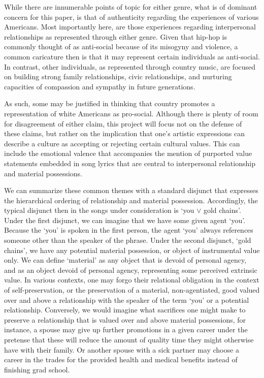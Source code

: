 \documentclass[
  12pt,
]{book}
\theoremstyle{definition}
\theoremstyle{definition}
\theoremstyle{definition}
\theoremstyle{definition}
\theoremstyle{remark}
\begin{document}
While there are innumerable points of topic for either genre, what is of dominant concern for this paper, is that of authenticity regarding the experiences of various Americans. Most importantly here, are those experiences regarding interpersonal relationships as represented through either genre. Given that hip-hop is commonly thought of as anti-social because of its misogyny and violence, a common caricature then is that it may represent certain individuals as anti-social. In contrast, other individuals, as represented through country music, are focused on building strong family relationships, civic relationships, and nurturing capacities of compassion and sympathy in future generations.

As such, some may be justified in thinking that country promotes a representation of white Americans as pro-social. Although there is plenty of room for disagreement of either claim, this project will focus not on the defense of these claims, but rather on the implication that one's artistic expressions can describe a culture as accepting or rejecting certain cultural values. This can include the emotional valence that accompanies the mention of purported value statements embedded in song lyrics that are central to interpersonal relationship and material possessions.

We can summarize these common themes with a standard disjunct that expresses the hierarchical ordering of relationship and material possession. Accordingly, the typical disjunct then in the songs under consideration is `you \(\lor\) gold chains'. Under the first disjunct, we can imagine that we have some given agent `you'. Because the `you' is spoken in the first person, the agent `you' always references someone other than the speaker of the phrase. Under the second disjunct, `gold chains', we have any potential material possession, or object of instrumental value only. We can define `material' as any object that is devoid of personal agency, and as an object devoid of personal agency, representing some perceived extrinsic value. In various contexts, one may forgo their relational obligation in the context of self-preservation, or the preservation of a material, non-agentiated, good valued over and above a relationship with the speaker of the term `you' or a potential relationship. Conversely, we would imagine what sacrifices one might make to preserve a relationship that is valued over and above material possessions, for instance, a spouse may give up further promotions in a given career under the pretense that these will reduce the amount of quality time they might otherwise have with their family. Or another spouse with a sick partner may choose a career in the trades for the provided health and medical benefits instead of finishing grad school.
\end{document}
